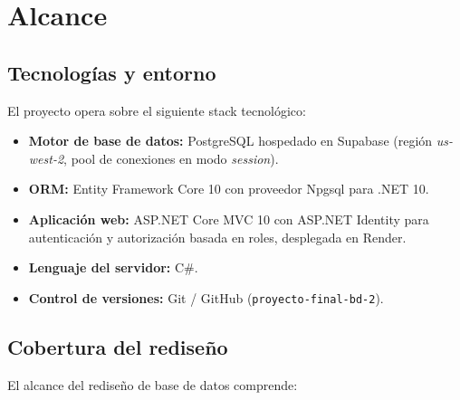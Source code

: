 
\section{Alcance}

\subsection{Tecnologías y entorno}

El proyecto opera sobre el siguiente stack tecnológico:

\begin{itemize}
  \item \textbf{Motor de base de datos:} PostgreSQL hospedado en Supabase (región \textit{us-west-2}, pool de conexiones en modo \textit{session}).
  \item \textbf{ORM:} Entity Framework Core 10 con proveedor Npgsql para .NET 10.
  \item \textbf{Aplicación web:} ASP.NET Core MVC 10 con ASP.NET Identity para autenticación y autorización basada en roles, desplegada en Render.
  \item \textbf{Lenguaje del servidor:} C\#.
  \item \textbf{Control de versiones:} Git / GitHub (\texttt{proyecto-final-bd-2}).
\end{itemize}

\subsection{Cobertura del rediseño}

El alcance del rediseño de base de datos comprende:

